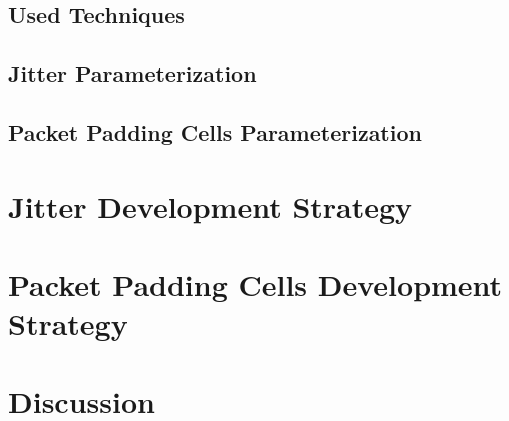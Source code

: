 
\subsection{Used Techniques}\label{sec:used_techniques}






\subsection{Jitter Parameterization}\label{sec:jitter_parameterization}


\subsection{Packet Padding Cells Parameterization}\label{sec:packet_padding_parameterization}


\section{Jitter Development Strategy}\label{sec:jitter_development_strategy}

\section{Packet Padding Cells Development Strategy}\label{sec:packet_padding_cells_development_strategy}

\section{Discussion}\label{sec:architeture_discussion}